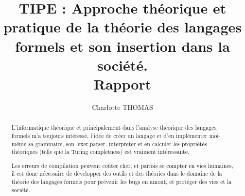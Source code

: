 \documentclass[11pt,hidelinks]{article}
\title{TIPE : Approche théorique et pratique de la théorie des langages formels et son insertion dans la société. \\ Rapport}
\author{Charlotte THOMAS}
\begin{document}
    \maketitle
    \begin{abstract}
        L'informatique théorique et principalement dans l'analyse théorique des langages formels m'a toujours intéressé, 
        l'idée de créer un langage et d'en implémenter moi-même sa grammaire, son lexer,parser, interpreter et en 
        calculer les propriétés théoriques (telle que la Turing completness) est vraiment intéressante.\par 
        \bigskip 

        Les erreurs de compilation peuvent coûter cher, et parfois se compter en vies humaines, il est donc 
        nécessaire de développer des outils et des théories dans le domaine de la théorie des langages formels 
        pour prévenir les bugs en amont, et protéger des vies et la société.
    \end{abstract}
\end{document}
